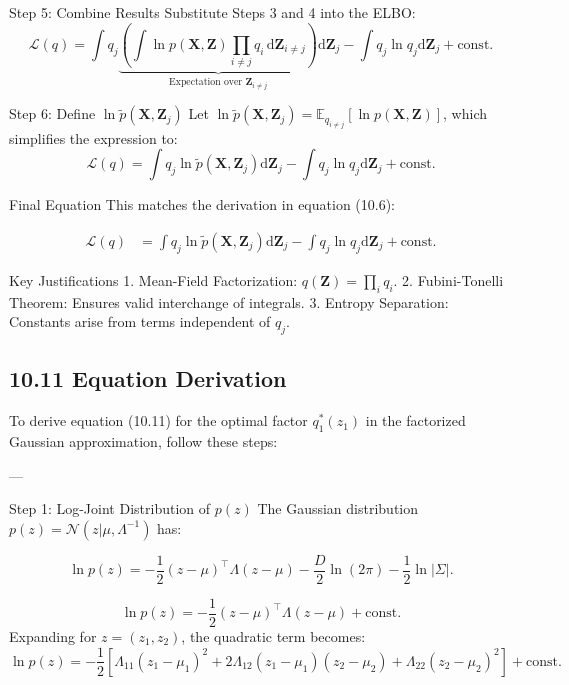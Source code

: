 \documentclass{article}
\begin{document}
\hrulefill

 Step 5: Combine Results
Substitute Steps 3 and 4 into the ELBO:
\[
\mathcal{L}(q) = \int q_j \underbrace{\left( \int \ln p(\mathbf{X}, \mathbf{Z}) \prod_{i \neq j} q_i \, \mathrm{d}\mathbf{Z}_{i \neq j} \right)}_{\text{Expectation over } \mathbf{Z}_{i \neq j}} \mathrm{d}\mathbf{Z}_j - \int q_j \ln q_j \mathrm{d}\mathbf{Z}_j + \text{const}.
\]

\hrulefill

 Step 6: Define \( \ln \widetilde{p}(\mathbf{X}, \mathbf{Z}_j) \)
Let \( \ln \widetilde{p}(\mathbf{X}, \mathbf{Z}_j) = \mathbb{E}_{q_{i \neq j}}[\ln p(\mathbf{X}, \mathbf{Z})] \), which simplifies the expression to:
\[
\mathcal{L}(q) = \int q_j \ln \widetilde{p}(\mathbf{X}, \mathbf{Z}_j) \mathrm{d}\mathbf{Z}_j - \int q_j \ln q_j \mathrm{d}\mathbf{Z}_j + \text{const}.
\]

\hrulefill

 Final Equation
This matches the derivation in equation (10.6):

\[
\begin{aligned}
\mathcal{L}(q) &= \int q_j \ln \widetilde{p}(\mathbf{X}, \mathbf{Z}_j) \mathrm{d}\mathbf{Z}_j - \int q_j \ln q_j \mathrm{d}\mathbf{Z}_j + \text{const}.
\end{aligned}
\]

\hrulefill

 Key Justifications
1. Mean-Field Factorization: \( q(\mathbf{Z}) = \prod_i q_i \).
2. Fubini-Tonelli Theorem: Ensures valid interchange of integrals.
3. Entropy Separation: Constants arise from terms independent of \( q_j \).

\subsection{10.11 Equation Derivation}

To derive equation (10.11) for the optimal factor \( q_1^*(z_1) \) in the factorized Gaussian approximation, follow these steps:

---

 Step 1: Log-Joint Distribution of \( p(z) \)
The Gaussian distribution \( p(z) = \mathcal{N}(z | \mu, \Lambda^{-1}) \) has:

$$\ln p(z)=-\frac{1}{2}(z-\mu)^{\top}\Lambda(z-\mu)-\frac{D}{2}\ln(2\pi)-\frac{1}{2}\ln|\Sigma|.$$

\[
\ln p(z) = -\frac{1}{2}(z - \mu)^\top \Lambda (z - \mu) + \text{const}.
\]
Expanding for \( z = (z_1, z_2) \), the quadratic term becomes:
\[
\ln p(z) = -\frac{1}{2} \left[ \Lambda_{11}(z_1 - \mu_1)^2 + 2\Lambda_{12}(z_1 - \mu_1)(z_2 - \mu_2) + \Lambda_{22}(z_2 - \mu_2)^2 \right] + \text{const}.
\]
\end{document}
